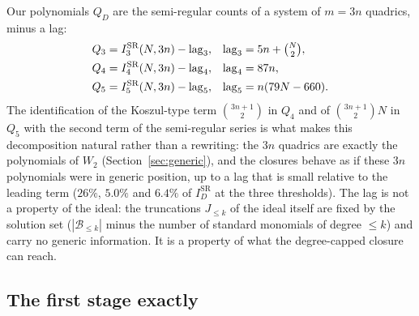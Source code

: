 \documentclass[11pt,a4paper]{article}
\theoremstyle{remark}\newtheorem{remark}{Remark}
\newcommand{\B}{\mathcal{B}}
\newcommand{\SR}{\mathrm{SR}}
\begin{document}
Our polynomials $Q_D$ are the semi-regular counts of a system of $m=3n$ quadrics, minus a lag:
\begin{align*}
Q_3&=I_3^{\SR}(N,3n)-\mathrm{lag}_3, & \mathrm{lag}_3&=5n+\tbinom N2,\\
Q_4&=I_4^{\SR}(N,3n)-\mathrm{lag}_4, & \mathrm{lag}_4&=87n,\\
Q_5&=I_5^{\SR}(N,3n)-\mathrm{lag}_5, & \mathrm{lag}_5&=n(79N-660).
\end{align*}
The identification of the Koszul-type term $\binom{3n+1}2$ in $Q_4$ and of $\binom{3n+1}2N$ in $Q_5$ with the second term of the semi-regular series is what makes this decomposition natural rather than a rewriting: the $3n$ quadrics are exactly the polynomials of $W_2$ (Section~\ref{sec:generic}), and the closures behave as if these $3n$ polynomials were in generic position, up to a lag that is small relative to the leading term ($26\%$, $5.0\%$ and $6.4\%$ of $I_D^{\SR}$ at the three thresholds). The lag is not a property of the ideal: the truncations $J_{\le k}$ of the ideal itself are fixed by the solution set ($|\B_{\le k}|$ minus the number of standard monomials of degree $\le k$) and carry no generic information. It is a property of what the degree-capped closure can reach.

\subsection{The first stage exactly}
\end{document}
